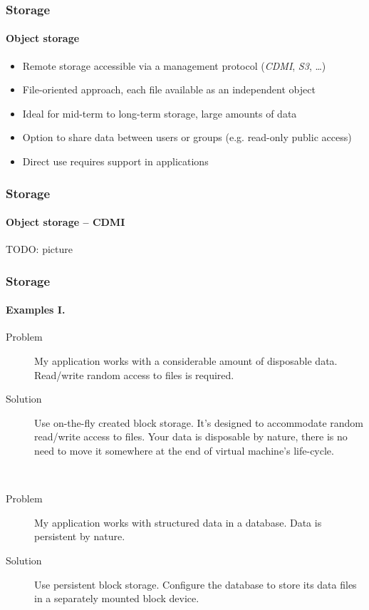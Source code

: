 \begin{frame}
  \frametitle{Storage}
  \framesubtitle{Object storage}

  \begin{itemize}
    \item Remote storage accessible via a management protocol
          (\textit{CDMI}, \textit{S3}, \dots)
    \item File-oriented approach, each file available as
          an independent object
    \item Ideal for mid-term to long-term storage, large
          amounts of data
    \item Option to share data between users or groups
          (e.g. read-only public access)
    \item Direct use requires support in applications
  \end{itemize}
\end{frame}

\begin{frame}
  \frametitle{Storage}
  \framesubtitle{Object storage -- CDMI}

  TODO: picture
\end{frame}

\begin{frame}
  \frametitle{Storage}
  \framesubtitle{Examples I.}

  \begin{description}
    \item[Problem] My application works with a considerable amount of disposable data. Read/write random access to files is required.
    \item[Solution] Use on-the-fly created block storage. It's designed to accommodate random read/write access to files. Your data
                    is disposable by nature, there is no need to move it somewhere at the end of virtual machine's life-cycle.
  \end{description}

  \hfill \\

  \begin{description}
    \item[Problem] My application works with structured data in a database. Data is persistent by nature.
    \item[Solution] Use persistent block storage. Configure the database to store its data files in a separately mounted block device.
  \end{description}
\end{frame}

